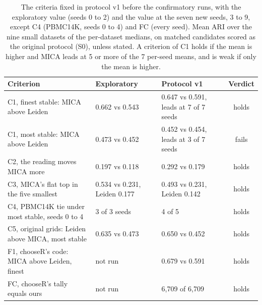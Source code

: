 \begin{table}[t]
\centering
\caption{The criteria fixed in protocol v1 before the confirmatory runs, with the exploratory value (seeds 0 to 2) and the value at the seven new seeds, 3 to 9, except C4 (PBMC14K, seeds 0 to 4) and FC (every seed). Mean ARI over the nine small datasets of the per-dataset medians, on matched candidates scored as the original protocol (S0), unless stated. A criterion of C1 holds if the mean is higher and MICA leads at 5 or more of the 7 per-seed means, and is weak if only the mean is higher.}
\label{tab:criteria}
\footnotesize
\setlength{\tabcolsep}{4pt}
\begin{tabular}{lllc}
\toprule
Criterion & Exploratory & Protocol v1 & Verdict \\
\midrule
C1, finest stable: MICA above Leiden & 0.662 vs 0.543 & 0.647 vs 0.591, leads at 7 of 7 seeds & holds \\
C1, most stable: MICA above Leiden & 0.473 vs 0.452 & 0.452 vs 0.454, leads at 3 of 7 seeds & fails \\
C2, the reading moves MICA more & 0.197 vs 0.118 & 0.292 vs 0.179 & holds \\
C3, MICA's flat top in the five smallest & 0.534 vs 0.231, Leiden 0.177 & 0.493 vs 0.231, Leiden 0.142 & holds \\
C4, PBMC14K tie under most stable, seeds 0 to 4 & 3 of 3 seeds & 4 of 5 & holds \\
C5, original grids: Leiden above MICA, most stable & 0.635 vs 0.473 & 0.650 vs 0.452 & holds \\
F1, chooseR's code: MICA above Leiden, finest & not run & 0.679 vs 0.591 & holds \\
FC, chooseR's tally equals ours & not run & 6,709 of 6,709 & holds \\
\bottomrule
\end{tabular}
\end{table}
